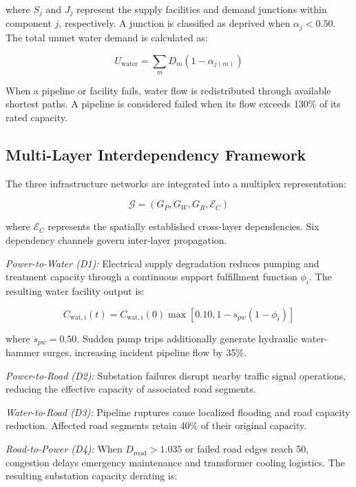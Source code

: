 \documentclass[oneside]{ieeeaccess}
\begin{document}
where $S_j$ and $J_j$ represent the supply facilities and demand junctions within component $j$, respectively. A junction is classified as deprived when $\alpha_j<0.50$. The total unmet water demand is calculated as:

\begin{equation}
U_{\mathrm{water}}=
\sum_m D_m(1-\alpha_{j(m)})
\label{eq:unmet}
\end{equation}

When a pipeline or facility fails, water flow is redistributed through available shortest paths. A pipeline is considered failed when its flow exceeds 130\% of its rated capacity.

\subsection{Multi-Layer Interdependency Framework}

The three infrastructure networks are integrated into a multiplex representation:

\begin{equation}
\mathcal{G}=(G_P,G_W,G_R,\mathcal{E}_C)
\label{eq:multiplex}
\end{equation}

where $\mathcal{E}_C$ represents the spatially established cross-layer dependencies. Six dependency channels govern inter-layer propagation.

\textit{Power-to-Water (D1):} Electrical supply degradation reduces pumping and treatment capacity through a continuous support fulfillment function $\phi_i$. The resulting water facility output is:

\begin{equation}
C_{\mathrm{wat},i}(t)=C_{\mathrm{wat},i}(0)
\max[0.10,1-s_{pw}(1-\phi_i)]
\label{eq:pw}
\end{equation}

where $s_{pw}=0.50$. Sudden pump trips additionally generate hydraulic water-hammer surges, increasing incident pipeline flow by 35\%.

\textit{Power-to-Road (D2):} Substation failures disrupt nearby traffic signal operations, reducing the effective capacity of associated road segments.

\textit{Water-to-Road (D3):} Pipeline ruptures cause localized flooding and road capacity reduction. Affected road segments retain 40\% of their original capacity.

\textit{Road-to-Power (D4):} When $D_{\mathrm{road}}>1.035$ or failed road edges reach 50, congestion delays emergency maintenance and transformer cooling logistics. The resulting substation capacity derating is:
\end{document}
